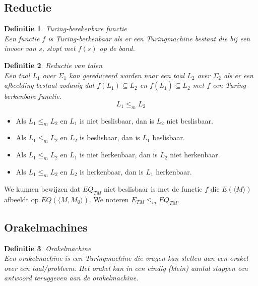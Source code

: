 \documentclass[a4paper]{article}
\newtheorem{tdefinitie}{Definitie}[section]
\newenvironment{definitie}[1]%
  {\begin{mdframed}[backgroundcolor=silver,
    topline=false,
    rightline=false,
    leftline=false,
    bottomline=false]\begin{tdefinitie}#1\\\normalfont}%
  {\end{tdefinitie}\end{mdframed}}
\newcommand{\sstar}{\ensuremath{\Sigma^*}}
\newcommand{\etm}{\ensuremath{{E_{TM}}}}
\newcommand{\eqtm}{\ensuremath{{EQ_{TM}}}}
\begin{document}

\subsection{Reductie}

\begin{definitie}{Turing-berekenbare functie}
  Een functie $f$ is Turing-berkenbaar als er een Turingmachine bestaat die bij een invoer van $s$, stopt met $f(s)$ op de band.
\end{definitie}

\begin{definitie}{Reductie van talen}
  Een taal $L_1$ over $\Sigma_1$ kan gereduceerd worden naar een taal $L_2$ over $\Sigma_2$ als er een afbeelding \bm{$f: \sstar_1 \rightarrow \sstar_2$} bestaat zodanig dat $f(L_1) \subseteq L_2$ en $f(\overline{L_1}) \subseteq \overline{L_2}$ met $f$ een Turing-berkenbare functie.
  \begin{equation*}
  L_1 \leq_m L_2
  \end{equation*}
\end{definitie}

\begin{itemize}
\item Als $L_1 \leq_m L_2$ en $L_1$ is niet beslisbaar, dan is $L_2$ niet beslisbaar.
\item Als $L_1 \leq_m L_2$ en $L_2$ is beslisbaar, dan is $L_1$ beslisbaar.
\item Als $L_1 \leq_m L_2$ en $L_1$ is niet herkenbaar, dan is $L_2$ niet herkenbaar.
\item Als $L_1 \leq_m L_2$ en $L_2$ is herkenbaar, dan is $L_1$ herkenbaar.
\end{itemize}

We kunnen bewijzen dat $\eqtm$ niet beslisbaar is met de functie $f$ die $E(\langle M \rangle)$ afbeeldt op $EQ(\langle M,M_\emptyset \rangle)$. We noteren $\etm \leq_m \eqtm$.


\subsection{Orakelmachines}

\begin{definitie}{Orakelmachine}
  Een orakelmachine is een Turingmachine die vragen kan stellen aan een orakel over een taal/probleem. Het orakel kan in een eindig (klein) aantal stappen een antwoord teruggeven aan de orakelmachine.
\end{definitie}
\end{document}

